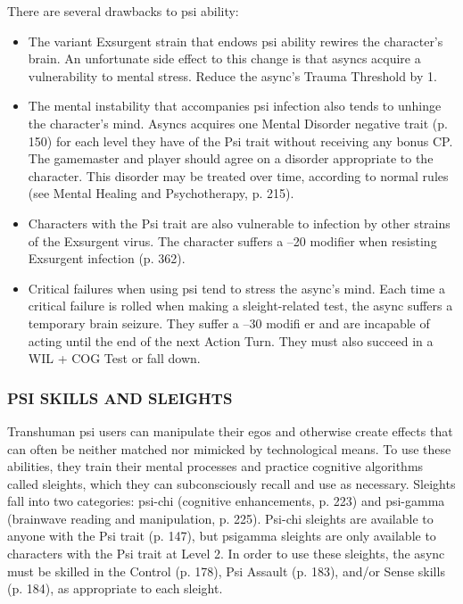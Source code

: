 There are several drawbacks to psi ability:

\begin{itemize}
\item The variant Exsurgent strain that endows psi ability
rewires the character’s brain. An unfortunate side
effect to this change is that asyncs acquire a vulnerability
to mental stress. Reduce the async’s Trauma
Threshold by 1.
\item The mental instability that accompanies psi infection
also tends to unhinge the character’s mind.
Asyncs acquires one Mental Disorder negative trait
(p. 150) for each level they have of the Psi trait
without receiving any bonus CP. The gamemaster
and player should agree on a disorder appropriate
to the character. This disorder may be treated over
time, according to normal rules (see Mental Healing
and Psychotherapy, p. 215).
\item Characters with the Psi trait are also vulnerable to
infection by other strains of the Exsurgent virus.
The character suffers a –20 modifier when resisting
Exsurgent infection (p. 362).
\item Critical failures when using psi tend to stress the
async’s mind. Each time a critical failure is rolled
when making a sleight-related test, the async suffers
a temporary brain seizure. They suffer a –30 modifi
er and are incapable of acting until the end of the
next Action Turn. They must also succeed in a WIL
+ COG Test or fall down.
\end{itemize}

\subsubsection{PSI SKILLS AND SLEIGHTS}

Transhuman psi users can manipulate their egos and
otherwise create effects that can often be neither
matched nor mimicked by technological means. To use
these abilities, they train their mental processes and
practice cognitive algorithms called sleights, which
they can subconsciously recall and use as necessary.
Sleights fall into two categories: psi-chi (cognitive
enhancements, p. 223) and psi-gamma (brainwave
reading and manipulation, p. 225). Psi-chi sleights are
available to anyone with the Psi trait (p. 147), but psigamma
sleights are only available to characters with
the Psi trait at Level 2. In order to use these sleights,
the async must be skilled in the Control (p. 178), Psi
Assault (p. 183), and/or Sense skills (p. 184), as appropriate
to each sleight.

